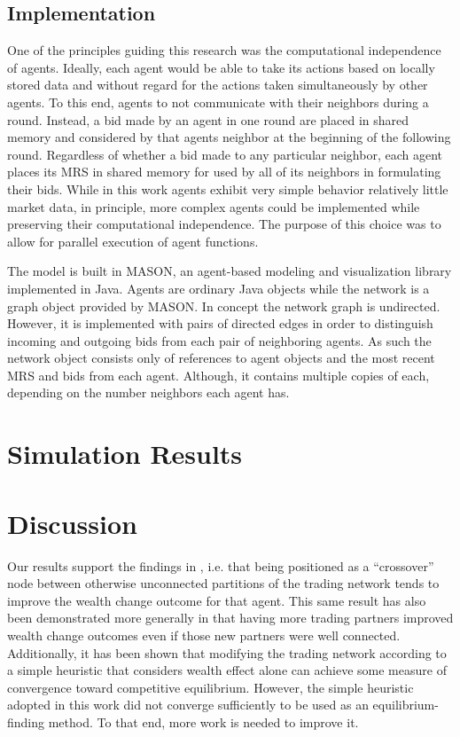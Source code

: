 \documentclass[smallextended]{svjour3}
\begin{document}
\subsection{Implementation}
One of the principles guiding this research was the computational independence
of agents. Ideally, each agent would be able to take its actions based on
locally stored data and without regard for the actions taken simultaneously by
other agents.
To this end, agents to not communicate with their neighbors during a round.
Instead, a bid made by an agent in one round are placed in shared memory and
considered by that agents neighbor at the beginning of the following round.
Regardless of whether a bid made to any particular neighbor, each agent places
its MRS in shared memory for used by all of its neighbors in formulating their
bids.
While in this work agents exhibit very simple behavior relatively little market
data, in principle, more complex agents could be implemented while preserving
their computational independence.
The purpose of this choice was to allow for parallel execution of agent
functions.

The model is built in MASON, an agent-based modeling and visualization
library implemented in Java. Agents are ordinary Java objects while the network
is a graph object provided by MASON. In concept the network graph is undirected.
However, it is implemented with pairs of directed edges in order to distinguish incoming
and outgoing bids from each pair of neighboring agents. As such the network
object consists only of references to agent objects and the most recent MRS and
bids from each agent. Although, it contains multiple copies of each, depending
on the number neighbors each agent has.

\section{Simulation Results}

\section{Discussion}
Our results support the findings in \cite {wilhite2001bilateral}, i.e. that being positioned as a ``crossover'' node between otherwise
unconnected partitions of the trading network tends to improve the wealth change
outcome for that agent.
This same result has also been demonstrated more generally in that having more trading partners improved wealth change outcomes even if those new partners were well connected.
Additionally, it has been shown that modifying the trading network according to a
simple heuristic that considers wealth effect alone can achieve some measure of
convergence toward competitive equilibrium.
However, the simple heuristic adopted in this work did not converge
sufficiently to be used as an equilibrium-finding method. To that end, more work is needed to improve it.
\end{document}
